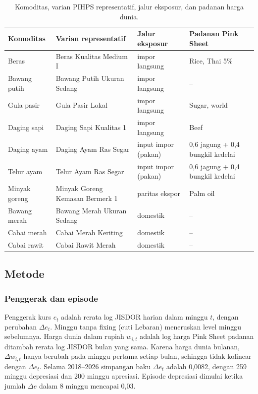 \documentclass[11pt,a4paper]{article}
\begin{document}
\begin{table}[!htbp]
\centering\small
\caption{Komoditas, varian PIHPS representatif, jalur eksposur, dan padanan harga dunia.}
\label{tab:komoditas}
\begin{tabularx}{\textwidth}{@{}l X l l@{}}
\toprule
Komoditas & Varian representatif & Jalur eksposur & Padanan Pink Sheet \\
\midrule
Beras & Beras Kualitas Medium I & impor langsung & Rice, Thai 5\% \\
Bawang putih & Bawang Putih Ukuran Sedang & impor langsung & -- \\
Gula pasir & Gula Pasir Lokal & impor langsung & Sugar, world \\
Daging sapi & Daging Sapi Kualitas 1 & impor langsung & Beef \\
Daging ayam & Daging Ayam Ras Segar & input impor (pakan) & 0,6 jagung + 0,4 bungkil kedelai \\
Telur ayam & Telur Ayam Ras Segar & input impor (pakan) & 0,6 jagung + 0,4 bungkil kedelai \\
Minyak goreng & Minyak Goreng Kemasan Bermerk 1 & paritas ekspor & Palm oil \\
Bawang merah & Bawang Merah Ukuran Sedang & domestik & -- \\
Cabai merah & Cabai Merah Keriting & domestik & -- \\
Cabai rawit & Cabai Rawit Merah & domestik & -- \\
\bottomrule
\end{tabularx}
\end{table}

\subsection{Metode}

\subsubsection{Penggerak dan episode}
Penggerak kurs $e_t$ adalah rerata log JISDOR harian dalam minggu $t$, dengan perubahan $\Delta e_t$. Minggu tanpa fixing (cuti
Lebaran) meneruskan level minggu sebelumnya. Harga dunia dalam rupiah $w_{i,t}$ adalah log harga Pink Sheet padanan ditambah rerata
log JISDOR bulan yang sama. Karena harga dunia bulanan, $\Delta w_{i,t}$ hanya berubah pada minggu pertama setiap bulan, sehingga
tidak kolinear dengan $\Delta e_t$. Selama 2018–2026 simpangan baku $\Delta e_t$ adalah 0,0082, dengan 259 minggu depresiasi dan 200
minggu apresiasi. Episode depresiasi dimulai ketika jumlah $\Delta e$ dalam 8 minggu mencapai 0,03.
\end{document}
